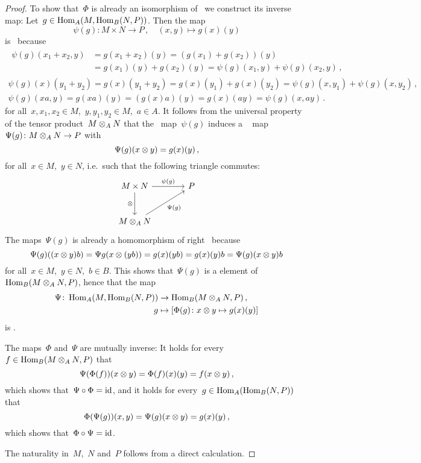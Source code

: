 \begin{proof}
  To show that~$\Phi$ is already an isomorphism of~{\modules{$\kf$}} we construct its inverse map:
  Let~$g \in \operatorname{Hom}_A(M, \operatorname{Hom}_B(N,P))$.
  Then the map
  \[
            \psi(g)
    \colon  M \times N
    \to     P \,,
    \quad   (x,y)
    \mapsto g(x)(y)
  \]
  is~{} because
  \begin{gather*}
    \begin{aligned}
          \psi(g)(x_1 + x_2, y)
      &=  g(x_1 + x_2)(y)
       =  (g(x_1) + g(x_2))(y)  \\
      &=  g(x_1)(y) + g(x_2)(y)
       =  \psi(g)(x_1,y) + \psi(g)(x_2,y) \,,
    \end{aligned}
  \\
      \psi(g)(x)(y_1 + y_2)
    = g(x)(y_1 + y_2)
    = g(x)(y_1) + g(x)(y_2)
    = \psi(g)(x, y_1) + \psi(g)(x, y_2) \,,
  \\
      \psi(g)(xa, y)
    = g(xa)(y)
    = (g(x)a)(y)
    = g(x)(ay)
    = \psi(g)(x,ay) \,.
  \end{gather*}
  for all~$x, x_1, x_2 \in M$,~$y, y_1, y_2 \in M$,~$a \in A$.
  It follows from the universal property of the tensor product~$M \otimes_A N$ that the~{} map~$\psi(g)$ induces a {\welldef}~{\klin} map~$\Psi(g) \colon M \otimes_A N \to P$ with
  \[
      \Psi(g)(x \otimes y)
    = g(x)(y) \,,
  \]
  for all~$x \in M$,~$y \in N$, i.e.\ such that the following triangle commutes:
  \[
    \begin{tikzcd}[sep = large]
        M \times N
        \arrow{r}[above]{\psi(g)}
        \arrow{d}[left]{\tensor}
      & P
      \\
        M \tensor_A N
        \arrow{ur}[below right]{\Psi(g)}
      & {}
    \end{tikzcd}
  \]
  The maps~$\Psi(g)$ is already a homomorphism of right~{} because
  \[
      \Psi(g)((x \otimes y) b)
    = \Psi{g}(x \otimes (yb))
    = g(x)(yb)
    = g(x)(y) b
    = \Psi(g)(x \otimes y) b
  \]
  for all~$x \in M$,~$y \in N$,~$b \in B$.
  This shows that~$\Psi(g)$ is a {\welldef} element of~$\operatorname{Hom}_B(M \otimes_A N, P)$, hence that the map
  \begin{align*}
              \Psi
     \colon   \operatorname{Hom}_A(M, \operatorname{Hom}_B(N,P))
    &\to      \operatorname{Hom}_B(M \otimes_A N, P) \,, \\
              g
    &\mapsto  \left[
                        \Phi(g)
                \colon  x \otimes y
                \mapsto g(x)(y)
              \right]
  \end{align*}
  is {\welldef}.
  
  The maps~$\Phi$ and~$\Psi$ are mutually inverse:
  It holds for every~$f \in \operatorname{Hom}_B(M \otimes_A N, P)$ that
  \[
      \Psi(\Phi(f))(x \otimes y)
    = \Phi(f)(x)(y)
    = f(x \otimes y) \,,
  \]
  which shows that~$\Psi \circ \Phi = \operatorname{id}$, and it holds for every~$g \in \operatorname{Hom}_A(\operatorname{Hom}_B(N, P))$ that
  \[
      \Phi(\Psi(g))(x,y)
    = \Psi(g)(x \otimes y)
    = g(x)(y) \,,
  \]
  which shows that~$\Phi \circ \Psi = \operatorname{id}$.
  
  The naturality in~$M$,~$N$ and~$P$ follows from a direct calculation.
\end{proof}




